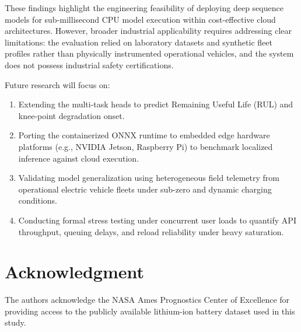 \documentclass[conference]{IEEEtran}
\begin{document}
These findings highlight the engineering feasibility of deploying deep sequence models for sub-millisecond CPU model execution within cost-effective cloud architectures. However, broader industrial applicability requires addressing clear limitations: the evaluation relied on laboratory datasets and synthetic fleet profiles rather than physically instrumented operational vehicles, and the system does not possess industrial safety certifications.

Future research will focus on:
\begin{enumerate}
    \item Extending the multi-task heads to predict Remaining Useful Life (RUL) and knee-point degradation onset.
    \item Porting the containerized ONNX runtime to embedded edge hardware platforms (e.g., NVIDIA Jetson, Raspberry Pi) to benchmark localized inference against cloud execution.
    \item Validating model generalization using heterogeneous field telemetry from operational electric vehicle fleets under sub-zero and dynamic charging conditions.
    \item Conducting formal stress testing under concurrent user loads to quantify API throughput, queuing delays, and reload reliability under heavy saturation.
\end{enumerate}

\section*{Acknowledgment}
The authors acknowledge the NASA Ames Prognostics Center of Excellence for providing access to the publicly available lithium-ion battery dataset used in this study.
\end{document}
